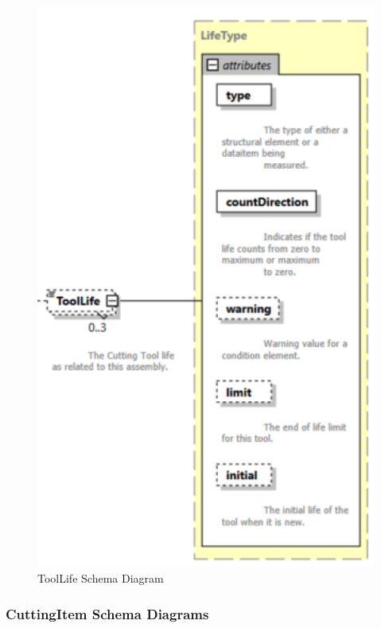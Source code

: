 \begin{figure}[ht]
  \centering
    \includegraphics[width=1.0\textwidth]{figures/ToolLife Schema.png}
  \caption{ToolLife Schema Diagram}
  \label{fig:ToolLife Schema Diagram}
\end{figure}

\FloatBarrier


\subsubsection{CuttingItem Schema Diagrams}
\label{sec:CuttingItem Schema Diagrams}

